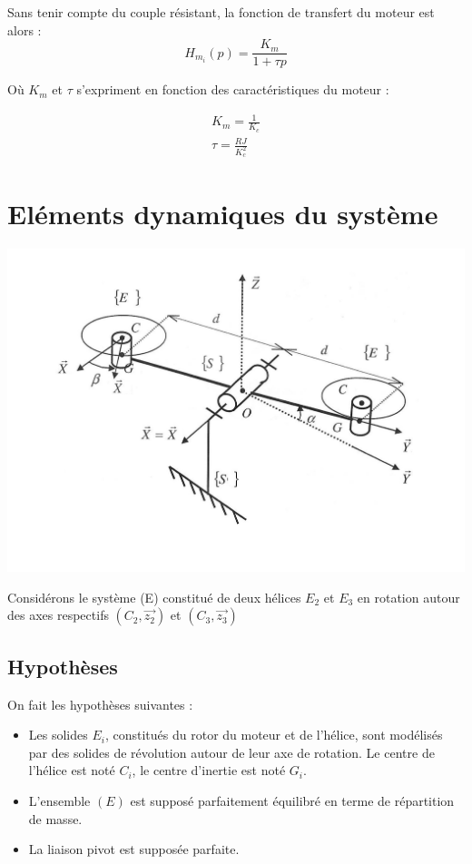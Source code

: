 \documentclass[10pt,a4paper]{article}
\begin{document}
Sans tenir compte du couple résistant, la fonction de transfert du moteur est alors :
\begin{equation}
H_{m_{i}}(p) = \frac{K_{m}}{1 + \tau p}
\end{equation}

Où $K_{m}$ et $\tau$ s'expriment en fonction des caractéristiques du moteur :

\begin{eqnarray}
K_{m} = \frac{1}{K_{c}} \\
\tau = \frac{R J}{K_{c}^2}
\end{eqnarray}



\section{Eléments dynamiques du système}

\includegraphics[scale=0.2]{schemaCinematique.pdf}

Considérons le système (E) constitué de deux hélices $E_{2}$ et $E_{3}$ en rotation autour des axes respectifs $(C_{2},\vec{z_{2}})$ et $(C_{3},\vec{z_{3}})$

\subsection{Hypothèses}
On fait les hypothèses suivantes : 
\begin{itemize}
\item Les solides $E_{i}$, constitués du rotor du moteur et de l'hélice, sont modélisés par des solides de révolution autour de leur axe de rotation. Le centre de l'hélice est noté $C_{i}$, le centre d'inertie est noté $G_{i}$.
\item L'ensemble $(E)$ est supposé parfaitement équilibré en terme de répartition de masse.
\item La liaison pivot est supposée parfaite.
\end{itemize}
\end{document}
